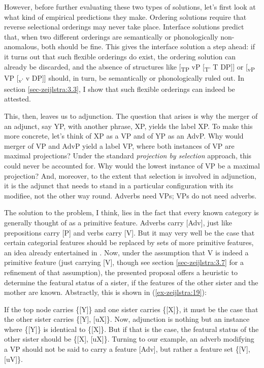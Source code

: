 \documentclass[output=paper
,modfonts
,nonflat]{langsci/langscibook}
\begin{document}
However, before further evaluating these two types of solutions, let’s first look at what kind of empirical predictions they make. Ordering solutions require that reverse selectional orderings may never take place. Interface solutions predict that, when two different orderings are semantically or phonologically non-anomalous, both should be fine. This gives the interface solution a step ahead: if it turns out that such flexible orderings do exist, the ordering solution can already be discarded, and the absence of structures like [\textsubscript{TP} vP [\textsubscript{T’} T DP]] or [\textsubscript{vP} VP [\textsubscript{v’} v DP]] should, in turn, be semantically or phonologically ruled out. In section \ref{sec-zeijlstra:3.3}, I show that such flexible orderings can indeed be attested.

This, then, leaves us to adjunction. The question that arises is why the merger of an adjunct, say YP, with another phrase, XP, yields the label XP. To make this more concrete, let’s think of XP as a VP and of YP as an AdvP. Why would merger of VP and AdvP yield a label VP, where both instances of VP are maximal projections? Under the standard \textit{projection by selection} approach, this could never be accounted for. Why would the lowest instance of VP be a maximal projection? And, moreover, to the extent that selection is involved in adjunction, it is the adjunct that needs to stand in a particular configuration with its modifiee, not the other way round. Adverbs need VPs; VPs do not need adverbs. 

The solution to the problem, I think, lies in the fact that every known category is generally thought of as a primitive feature. Adverbs carry [Adv], just like prepositions carry [P] and verbs carry [V]. But it may very well be the case that certain categorial features should be replaced by sets of more primitive features, an idea already entertained in \citet{Chomsky1970, Chomsky1981}. Now, under the assumption that V is indeed a primitive feature (just carrying [V], though see section \ref{sec-zeijlstra:3.7} for a refinement of that assumption), the presented proposal offers a heuristic to determine the featural status of a sister, if the features of the other sister and the mother are known. Abstractly, this is shown in (\ref{ex-zeijlstra:19}): 

\begin{figure}[!h]
	\begin{exe}
		\exbox{ \label{ex-zeijlstra:19}
			\begin{forest}	
				[\{{[}Y{]}\}
				[\{{[}X{]}\}]
				[\{{[}Y{]}{,} {[}uX{]}\}] ]
		\end{forest}}
	\end{exe} \vspace{-0.75cm}
\end{figure} 
\noindent If the top node carries \{[Y]\} and one sister carries \{[X]\}, it must be the case that the other sister carries \{[Y], [uX]\}. Now, adjunction is nothing but an instance where \{[Y]\} is identical to \{[X]\}. But if that is the case, the featural status of the other sister should be \{[X], [uX]\}. 
Turning to our example, an adverb modifying a VP should not be said to carry a feature [Adv], but rather a feature set \{[V], [uV]\}.
\end{document}
